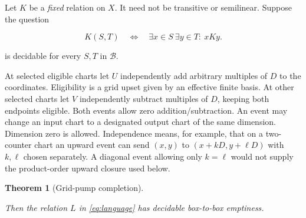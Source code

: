 \documentclass[11pt,a4paper]{article}
\newtheorem{theorem}{Theorem}
\theoremstyle{remark}
\begin{document}
Let \(K\) be a \emph{fixed} relation on \(X\). It need not be transitive or semilinear. Suppose the question

\begin{equation}
K(S,T)\quad\Longleftrightarrow\quad\exists x\in S\ \exists y\in T:\ xKy. \label{eq:box-query}
\end{equation}


is decidable for every \(S,T\) in \(\mathcal B\).

At selected eligible charts let \(U\) independently add arbitrary multiples of \(D\) to the coordinates. Eligibility is a grid upset given by an effective finite basis. At other selected charts let \(V\) independently subtract multiples of \(D\), keeping both endpoints eligible. Both events allow zero addition/subtraction. An event may change an input chart to a designated output chart of the same dimension. Dimension zero is allowed.
Independence means, for example, that on a two-counter chart an upward
event can send \((x,y)\) to \((x+kD,y+\ell D)\) with \(k,\ell\)
chosen separately. A diagonal event allowing only \(k=\ell\) would
not supply the product-order upward closure used below.

\begin{theorem}[Grid-pump completion]\label{thm:completion}

Then the relation \(L\) in \eqref{eq:language} has decidable box-to-box emptiness.

\end{theorem}
\end{document}
